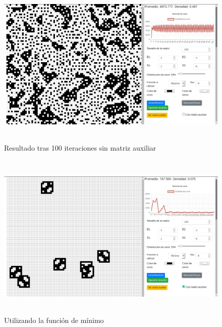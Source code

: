 \documentclass[12pt, titlepage]{article}
\begin{document}
\begin{figure}[H]
\begin{center}
 \includegraphics[width=15cm, height=8cm]{./img/3318.png}
 \caption{Resultado tras 100 iteraciones sin matriz auxiliar}
 \label{fig:3318}
\end{center}
\end{figure}

\begin{figure}[H]
\begin{center}
 \includegraphics[width=15cm, height=8cm]{./img/3318-min.png}
 \caption{Utilizando la función de mínimo}
 \label{fig:3318-min}
\end{center}
\end{figure}
\end{document}
